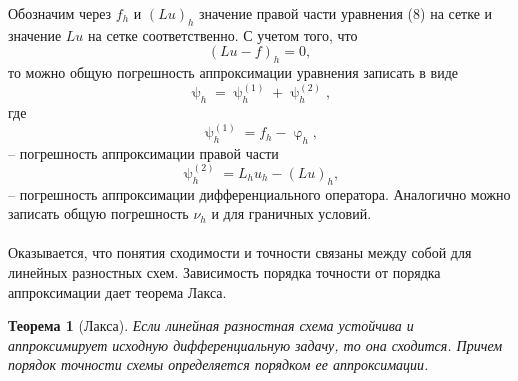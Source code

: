 \documentclass[a4paper, 12pt]{report}
\numberwithin{equation}{section}
\renewcommand{\varphi}{\upvarphi}
\renewcommand{\psi}{\uppsi}
\newtheorem*{theorem}{Теорема}
\begin{document}
Обозначим через $f_h$ и $(Lu)_h$ значение правой части уравнения (8) на сетке и значение $Lu$ на сетке соответственно. С учетом того, что 
$$(Lu - f)_h = 0,$$
то можно общую погрешность аппроксимации уравнения записать в виде
\begin{equation}
	\psi_h = \psi_h^{(1)} + \psi_h^{(2)},
\end{equation}
где
$$\psi_h^{(1)} = f_h - \varphi_h,$$ -- погрешность аппроксимации правой части
$$\psi_h^{(2)} = L_h u_h - (Lu)_h,$$ -- погрешность аппроксимации дифференциального оператора. Аналогично можно записать общую погрешность $\nu_h$ и для граничных условий.\\\\
Оказывается, что понятия сходимости и точности связаны между собой для линейных разностных схем. Зависимость порядка точности от порядка аппроксимации дает теорема Лакса.
\begin{theorem}
	[Лакса] Если линейная разностная схема устойчива и аппроксимирует исходную дифференциальную задачу, то она сходится. Причем порядок точности схемы определяется порядком ее аппроксимации.
\end{theorem}
\end{document}

